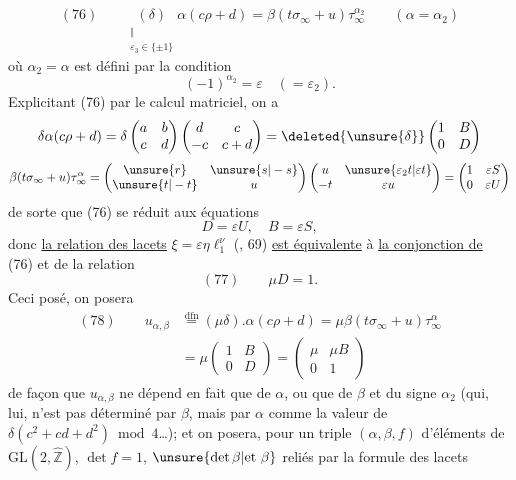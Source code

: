 \[
(76)\qquad
\underset{\substack{\Vert\\\varepsilon_3\in\{\pm1\}}}{(\delta)}
\alpha(c\rho+d)=\beta(t\sigma_\infty+u)\tau_\infty^{\alpha_2}
\qquad(\alpha=\alpha_2)
\]
où $\alpha_2=\alpha$ est défini par la condition
\[
(-1)^{\alpha_2}=\varepsilon\quad(=\varepsilon_2).
\]
Explicitant (76) par le calcul matriciel, on a
\[
\delta\alpha(c\rho+d)
=\delta\begin{pmatrix}a&b\\c&d\end{pmatrix}
\begin{pmatrix}d&c\\-c&c+d\end{pmatrix}
=\deleted{\unsure{\delta}}
\begin{pmatrix}1&B\\0&D\end{pmatrix}
\]
\[
\beta(t\sigma_\infty+u)\tau_\infty^\alpha
=\begin{pmatrix}\unsure{r}&\unsure{s|-s}\\\unsure{t|-t}&u\end{pmatrix}
\begin{pmatrix}u&\unsure{\varepsilon_2t|\varepsilon t}\\-t&\varepsilon u\end{pmatrix}
=\begin{pmatrix}1&\varepsilon S\\0&\varepsilon U\end{pmatrix}
\]
de sorte que (76) se réduit aux équations
\[
D=\varepsilon U,\quad B=\varepsilon S,
\]
donc \uline{la relation des lacets} $\xi=\varepsilon\eta \ell_1^\nu$ (, 69) \uline{est équivalente} à \uline{la conjonction de} (76) et de la relation
\[
(77)\qquad\mu D=1.
\]
Ceci posé, on posera 
\[
\begin{aligned}
(78)\qquad u_{\alpha,\beta}
&\overset{\mathrm{dfn}}{=}(\mu\delta).\alpha(c\rho+d)
=\mu\beta(t\sigma_\infty+u)\tau_\infty^\alpha\\
&=\mu\begin{pmatrix}1&B\\0&D\end{pmatrix}
=\begin{pmatrix}\mu&\mu B\\0&1\end{pmatrix}
\end{aligned}
\]
de façon que $u_{\alpha,\beta}$ ne dépend en fait que de $\alpha$, ou que de $\beta$ et du signe $\alpha_2$ (qui, lui, n'est pas déterminé par $\beta$, mais par $\alpha$ comme la valeur de $\delta(c^2+cd+d^2)\bmod4$\dots); et on posera, pour un triple $(\alpha,\beta,f)$ d'éléments de $\mathrm{GL}(2,\widehat{\mathbb Z})$, $\det f=1$, $\unsure{\det\beta|\text{et }\beta}$ reliés par la formule des lacets

